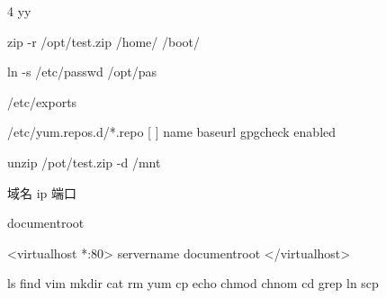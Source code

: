   4 yy


zip -r  /opt/test.zip   /home/  /boot/


ln  -s /etc/passwd   /opt/pas

/etc/exports

/etc/yum.repos.d/*.repo
[  ]  name  baseurl  gpgcheck  enabled

unzip  /pot/test.zip  -d  /mnt

域名     ip    端口


documentroot

<virtualhost  *:80>
servername
documentroot
</virtualhost>


ls   find  vim  mkdir  cat  rm  yum  cp  echo  chmod  chnom cd  grep  ln  scp
